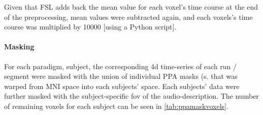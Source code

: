 
%
Given that FSL adds back the mean value for each voxel's time course at the end
of the preprocessing, mean values were subtracted again, and each voxels's time
course was multiplied by 10000 [using a Python script].


\paragraph{Masking}











For each paradigm, subject, the corresponding 4d time-series of each run /
segment were masked with the union of individual PPA masks (s.
\citep{haeusler2022processing} that was warped from MNI space into each
subjects' space. Each subjects' data were further masked with the
subject-specific \ac{fov} of the audio-description.
%
The number of remaining voxels for each subject can be seen in
\ref{tab:ppamaskvoxels}.

